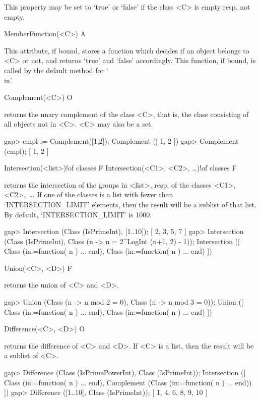 This property may be set to `true' or `false' if the class <C> is empty
resp. not empty.

\>MemberFunction(<C>) A

This attribute, if bound, stores a function which decides if an object
belongs to <C> or not, and returns `true' and `false' accordingly. This
function, if bound, is called by the default method for `\\in'.


\>Complement(<C>) O

returns the unary complement of the class <C>, that is, the class consisting
of all objects not in <C>. <C> may also be a set.

\beginexample
gap> cmpl := Complement([1,2]);
Complement ([ 1, 2 ])
gap> Complement (cmpl);
[ 1, 2 ]
\endexample

\>Intersection(<list>)!{of classes} F
\>Intersection(<C1>, <C2>, \dots)!{of classes} F

returns the intersection of the groups in <list>, resp. of the classes
<C1>, <C2>, \dots. If one of the classes is a list with fewer than
`INTERSECTION_LIMIT' elements, then the result will be
a sublist of that list. By default, `INTERSECTION_LIMIT' is 1000. 

\beginexample
gap> Intersection (Class (IsPrimeInt), [1..10]);
[ 2, 3, 5, 7 ]
gap> Intersection (Class (IsPrimeInt), Class (n -> n = 2^LogInt (n+1, 2) - 1));
Intersection ([ Class (in:=function( n ) ... end), 
  Class (in:=function( n ) ... end) ])
\endexample

\>Union(<C>, <D>) F

returns the union of <C> and <D>.  

\beginexample
gap> Union (Class (n -> n mod 2 = 0), Class (n -> n mod 3 = 0));
Union ([ Class (in:=function( n ) ... end), Class (in:=function( n ) ... end) 
 ])
\endexample

\>Difference(<C>, <D>) O

returns the difference of <C> and <D>. If <C> is a list, then the
result will be a sublist of <C>.

\beginexample
gap> Difference (Class (IsPrimePowerInt), Class (IsPrimeInt));
Intersection ([ Class (in:=function( n ) ... end), 
  Complement (Class (in:=function( n ) ... end)) ])
gap> Difference ([1..10], Class (IsPrimeInt));
[ 1, 4, 6, 8, 9, 10 ]
\endexample



